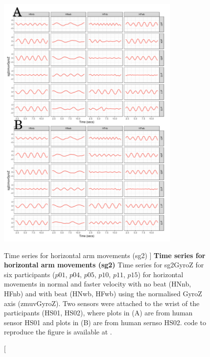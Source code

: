 \begin{figure}
\centering
\includegraphics[width=0.8\textwidth]{ts_H_sg2}
    	\caption
	[Time series for horizontal arm movements (sg2) ]{
	{\bf Time series for horizontal arm movements (sg2)}
		Time series for sg2GyroZ for six participants 
		($p01$, $p04$, $p05$, $p10$, $p11$, $p15$) 
		for horizontal movements in normal and faster velocity with
		no beat	(HNnb, HFnb) and with beat (HNwb, HFwb) using 
		the normalised GyroZ axis (zmuvGyroZ). 
		Two sensors were attached to the wrist of the participants (HS01, HS02),
		where plots in (A) are from human sensor HS01 and
		plots in (B) are from human sernso HS02.
       	\R code to reproduce the figure is available at 
	.
	}
    \label{fig:tssg2gyroZ-hii}
\end{figure}




